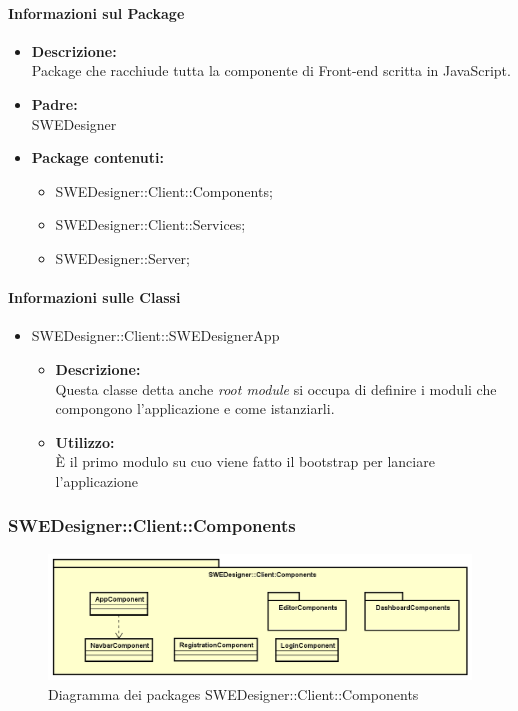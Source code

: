 		\paragraph{Informazioni sul Package}
		\begin{itemize}
			\item \textbf{Descrizione: }\\
			Package che racchiude tutta la componente di Front-end scritta in JavaScript.
			\item \textbf{Padre: }\\ SWEDesigner
			\item \textbf{Package contenuti: }
			\begin{itemize}
				\item SWEDesigner::Client::Components;
				\item SWEDesigner::Client::Services;
				\item SWEDesigner::Server;
			\end{itemize}
		\end{itemize}

		\paragraph{Informazioni sulle Classi}
		\begin{itemize}
			\item SWEDesigner::Client::SWEDesignerApp
			\begin{itemize}
				\item \textbf{Descrizione: }\\
				Questa classe detta anche \emph{root module} si occupa di definire i
				moduli che compongono l'applicazione e come istanziarli.
				\item \textbf{Utilizzo: }\\
				È il primo modulo su cuo viene fatto il bootstrap per lanciare l'applicazione
			\end{itemize}
		\end{itemize}


		\subsubsection{SWEDesigner::Client::Components}
		 \begin{figure}[h!]
		\centering
		\includegraphics[scale=0.4]{Disegnetti/SWEDesigner__Client_Components.png}
		\caption{Diagramma dei packages SWEDesigner::Client::Components}
 		\end{figure}
